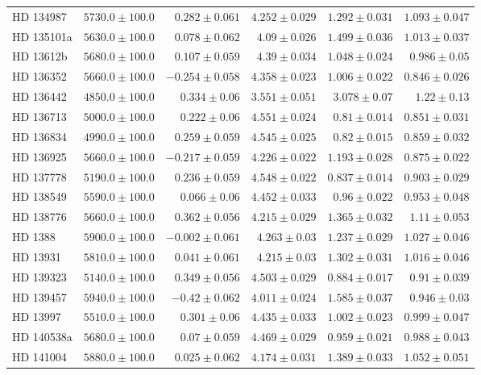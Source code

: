 \begin{longtable*}{lrrrrr}
HD 134987 & $5730.0\pm 100.0$ & $0.282\pm 0.061$ & $4.252\pm 0.029$ & $1.292\pm 0.031$ & $1.093\pm 0.047$ \\ 
HD 135101a & $5630.0\pm 100.0$ & $0.078\pm 0.062$ & $4.09\pm 0.026$ & $1.499\pm 0.036$ & $1.013\pm 0.037$ \\ 
HD 13612b & $5680.0\pm 100.0$ & $0.107\pm 0.059$ & $4.39\pm 0.034$ & $1.048\pm 0.024$ & $0.986\pm 0.05$ \\ 
HD 136352 & $5660.0\pm 100.0$ & $-0.254\pm 0.058$ & $4.358\pm 0.023$ & $1.006\pm 0.022$ & $0.846\pm 0.026$ \\ 
HD 136442 & $4850.0\pm 100.0$ & $0.334\pm 0.06$ & $3.551\pm 0.051$ & $3.078\pm 0.07$ & $1.22\pm 0.13$ \\ 
HD 136713 & $5000.0\pm 100.0$ & $0.222\pm 0.06$ & $4.551\pm 0.024$ & $0.81\pm 0.014$ & $0.851\pm 0.031$ \\ 
HD 136834 & $4990.0\pm 100.0$ & $0.259\pm 0.059$ & $4.545\pm 0.025$ & $0.82\pm 0.015$ & $0.859\pm 0.032$ \\ 
HD 136925 & $5660.0\pm 100.0$ & $-0.217\pm 0.059$ & $4.226\pm 0.022$ & $1.193\pm 0.028$ & $0.875\pm 0.022$ \\ 
HD 137778 & $5190.0\pm 100.0$ & $0.236\pm 0.059$ & $4.548\pm 0.022$ & $0.837\pm 0.014$ & $0.903\pm 0.029$ \\ 
HD 138549 & $5590.0\pm 100.0$ & $0.066\pm 0.06$ & $4.452\pm 0.033$ & $0.96\pm 0.022$ & $0.953\pm 0.048$ \\ 
HD 138776 & $5660.0\pm 100.0$ & $0.362\pm 0.056$ & $4.215\pm 0.029$ & $1.365\pm 0.032$ & $1.11\pm 0.053$ \\ 
HD 1388 & $5900.0\pm 100.0$ & $-0.002\pm 0.061$ & $4.263\pm 0.03$ & $1.237\pm 0.029$ & $1.027\pm 0.046$ \\ 
HD 13931 & $5810.0\pm 100.0$ & $0.041\pm 0.061$ & $4.215\pm 0.03$ & $1.302\pm 0.031$ & $1.016\pm 0.046$ \\ 
HD 139323 & $5140.0\pm 100.0$ & $0.349\pm 0.056$ & $4.503\pm 0.029$ & $0.884\pm 0.017$ & $0.91\pm 0.039$ \\ 
HD 139457 & $5940.0\pm 100.0$ & $-0.42\pm 0.062$ & $4.011\pm 0.024$ & $1.585\pm 0.037$ & $0.946\pm 0.03$ \\ 
HD 13997 & $5510.0\pm 100.0$ & $0.301\pm 0.06$ & $4.435\pm 0.033$ & $1.002\pm 0.023$ & $0.999\pm 0.047$ \\ 
HD 140538a & $5680.0\pm 100.0$ & $0.07\pm 0.059$ & $4.469\pm 0.029$ & $0.959\pm 0.021$ & $0.988\pm 0.043$ \\ 
HD 141004 & $5880.0\pm 100.0$ & $0.025\pm 0.062$ & $4.174\pm 0.031$ & $1.389\pm 0.033$ & $1.052\pm 0.051$ \\ 

\end{longtable*}
